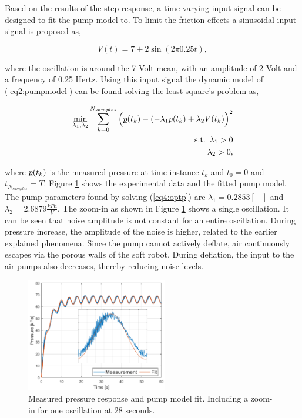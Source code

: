 Based on the results of the step response, a time varying input signal can be designed to fit the pump model to. To limit the friction effects a sinusoidal input signal is proposed as,

\begin{equation}
    V(t) =  7 + 2 \sin(2 \pi 0.25t),
    \label{eq3:vinput}
\end{equation}


where the oscillation is around the 7 Volt mean, with an amplitude of 2 Volt and a frequency of 0.25 Hertz. Using this input signal the dynamic model of (\ref{eq2:pumpmodel}) can be found solving the least square's problem as,


\begin{equation}
   \begin{aligned}
\min_{\lambda_1,\lambda_2} \sum_{k=0}^{N_{samples}} \Big(\underbar{$p$}(t_k) - (-\lambda_1 p(t_k) +\lambda_2 V(t_k)\Big)^2\\ 
\text{s.t.} \hspace{5pt} \lambda_1 > 0 \\
\lambda_2 > 0,
\label{eq4:optp}
\end{aligned}
\end{equation}



where $\underbar{$p$}(t_k)$ is the measured pressure at time instance $t_k$ and $t_0 = 0$ and $t_{N_{samples}} = T$. Figure \ref{fig3:pumpfit} shows the experimental data and the fitted pump model. The pump parameters found by solving (\ref{eq4:optp}) are $\lambda_1 = 0.2853 [-]$ and $\lambda_2 = 2.6879 \frac{kPa}{V}$. The zoom-in as shown in Figure \ref{fig3:pumpfit} shows a single oscillation. It can be seen that noise amplitude is not constant for an entire oscillation. During pressure increase, the amplitude of the noise is higher, related to the earlier explained phenomena. Since the pump cannot actively deflate, air continuously escapes via the porous walls of the soft robot. During deflation, the input to the air pumps also decreases, thereby reducing noise levels. 

\begin{figure}[H]
    \centering
    \includegraphics[width = 0.55\textwidth]{Figures/Chapter3/pressurewrap.png}
    \caption{Measured pressure response and pump model fit. Including a zoom-in for one oscillation at 28 seconds.}
    \label{fig3:pumpfit}
\end{figure}


